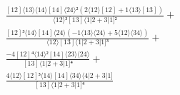 \documentclass[varwidth, border=5pt]{standalone}
\begin{document}
\begin{my}
$\begin{gathered}
\scriptscriptstyle\frac{[12]⟨13⟩⟨14⟩[14]⟨24⟩²(2⟨12⟩[12]+1⟨13⟩[13])}{⟨12⟩³[13]⟨1|2+3|1]²} +\\
\scriptscriptstyle\frac{[12]³⟨14⟩[14]⟨24⟩(-1⟨13⟩⟨24⟩+5⟨12⟩⟨34⟩)}{⟨12⟩[13]⟨1|2+3|1]³} +\\
\scriptscriptstyle\frac{-4[12]⁴⟨14⟩²[14]⟨23⟩⟨24⟩}{[13]⟨1|2+3|1]⁴} +\\
\scriptscriptstyle\frac{4⟨12⟩[12]³⟨14⟩[14]⟨34⟩⟨4|2+3|1]}{[13]⟨1|2+3|1]⁴} \phantom{+}
\end{gathered}$
\end{my}
\end{document}
